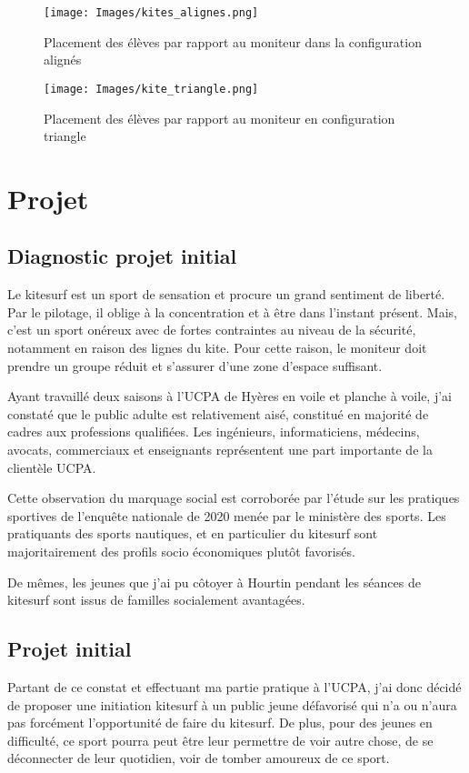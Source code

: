 \documentclass[11pt,a4paper]{report}
\begin{document}
\begin{figure}
\begin{minipage}{0.4\textwidth}
\texttt{[image: Images/kites\_alignes.png]} 
\caption{Placement des élèves par rapport au moniteur dans la configuration
alignés\label{kites_alignes}}
\end{minipage}
\hfill
\begin{minipage}{0.4\textwidth}
\texttt{[image: Images/kite\_triangle.png]} 
\caption{Placement des élèves par rapport au moniteur en configuration
triangle\label{kite_triangle}}
\end{minipage}
\end{figure}






\FloatBarrier
\section{Projet}
\subsection{Diagnostic projet initial}

Le kitesurf est un sport de sensation et procure un grand
sentiment de liberté. Par le pilotage, il oblige à 
la concentration et à \^etre dans l'instant présent.
Mais, c'est un sport onéreux avec de fortes contraintes
au niveau de la sécurité, notamment en raison des lignes du kite.
Pour cette raison, le moniteur doit prendre un groupe réduit
et s'assurer d'une zone  d'espace suffisant. 

Ayant travaillé deux saisons  à l'UCPA de Hyères en voile
et planche à voile, j'ai  constaté que le public adulte est relativement
aisé, constitué en majorité de cadres aux professions qualifiées. Les
ingénieurs, informaticiens, médecins, avocats, commerciaux et enseignants
représentent une part importante de la clientèle UCPA.

Cette observation du marquage social  est corroborée par l'étude sur 
les pratiques sportives de l'enqu\^ete nationale de
2020 menée par le ministère des sports\cite{injep}. Les pratiquants
des sports nautiques, et en particulier du kitesurf sont majoritairement
des profils socio économiques plut\^ot favorisés.

De m\^emes, les jeunes que j'ai pu côtoyer à Hourtin
pendant les séances de kitesurf sont  issus de
familles socialement avantagées.

\subsection{Projet initial}
Partant de ce constat et effectuant ma partie pratique à l'UCPA,
j'ai donc décidé de proposer une initiation kitesurf à un public jeune
défavorisé qui n'a ou n'aura pas forcément l'opportunité de faire du kitesurf. 
De plus, pour des jeunes en difficulté, ce sport pourra peut être 
leur permettre de voir autre chose, de se déconnecter de leur quotidien,
voir de tomber amoureux de ce sport.
\end{document}
